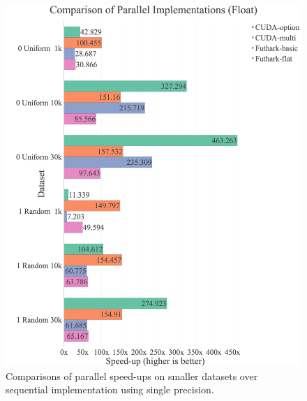 \begin{figure}[H]
	\centering
	\caption{Comparisons of parallel speed-ups on smaller datasets over sequential implementation using single precision.}
    \label{fig:results:speedup-float-small}
    \includegraphics[width=1\textwidth]{img/experiments/small-text-approaches-float.png}
\end{figure}

